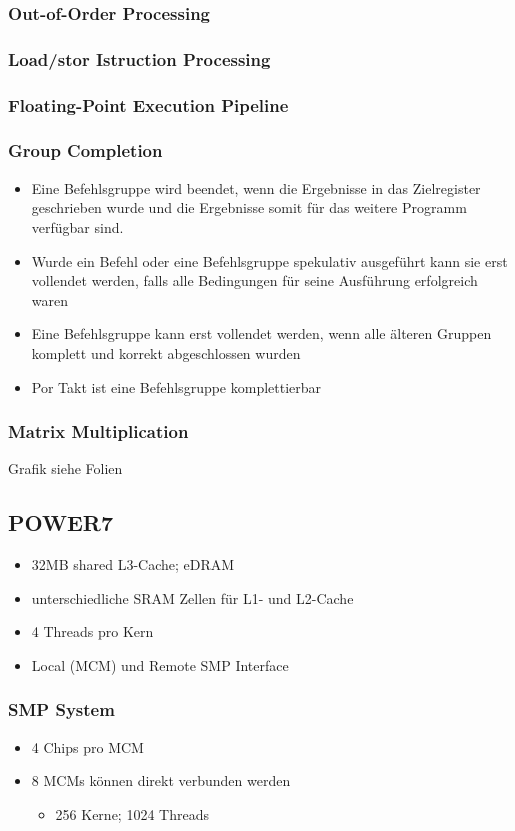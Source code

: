 \subsubsection{Out-of-Order Processing}
\subsubsection{Load/stor Istruction Processing }
\subsubsection{Floating-Point Execution Pipeline}
\subsubsection{Group Completion}
\begin{itemize}
	\item Eine Befehlsgruppe wird beendet, wenn die Ergebnisse in das Zielregister geschrieben wurde und die Ergebnisse somit für das weitere Programm verfügbar sind.
	\item Wurde ein Befehl oder eine Befehlsgruppe spekulativ ausgeführt kann sie erst vollendet werden, falls alle Bedingungen für seine Ausführung erfolgreich waren
	\item Eine Befehlsgruppe kann erst vollendet werden, wenn alle älteren Gruppen komplett und korrekt abgeschlossen wurden
	\item Por Takt ist eine Befehlsgruppe komplettierbar
\end{itemize}
\subsubsection{Matrix Multiplication}
Grafik siehe Folien
\subsection{POWER7}
\begin{itemize}
	\item 32MB shared L3-Cache; eDRAM
	\item unterschiedliche SRAM Zellen für L1- und L2-Cache
	\item 4 Threads pro Kern
	\item Local (MCM) und Remote SMP Interface
	
\end{itemize}
\subsubsection{SMP System}
\begin{itemize}
	\item 4 Chips pro MCM
	\item 8 MCMs können direkt verbunden werden
	\begin{itemize}
		\item 256 Kerne; 1024 Threads
	\end{itemize}
\end{itemize}
